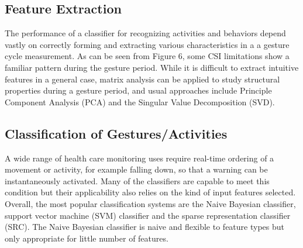 \documentclass[conference]{IEEEtran}
\begin{document}
\subsection{Feature Extraction}
The performance of a classifier for recognizing activities and behaviors depend vastly on correctly forming and extracting various characteristics in a a gesture cycle measurement. As can be seen from Figure 6, some CSI limitations show a familiar pattern during the gesture period. While it is difficult to extract intuitive features in a general case, matrix analysis can be applied to study structural properties during a gesture period, and usual approaches include Principle Component Analysis (PCA) and the Singular Value Decomposition (SVD). 
\subsection{Classification of Gestures/Activities}
A wide range of health care monitoring uses require real-time ordering of a movement or activity, for example falling down, so that a warning can be instantaneously activated. Many of the classifiers are capable to meet this condition but their applicability also relies on the kind of input features selected. Overall, the most popular classification systems are the Naive Bayesian classifier, support vector machine (SVM) classifier and the sparse representation classifier (SRC). The Naive Bayesian classifier is naive and flexible to feature types but only appropriate for little number of features. 
\end{document}
